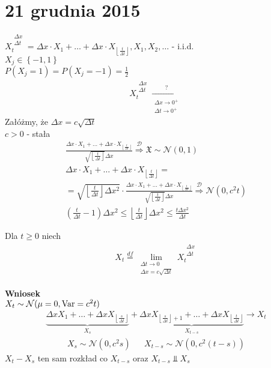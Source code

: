 \chapter{21 grudnia 2015}
$ X_t^{\substack{\Delta x\\\Delta t}} =\Delta x\cdot X_1+\dots +\Delta x\cdot X_{\left \lfloor\frac{t}{\Delta t}\right \rfloor}, X_1,X_2,\dots$ - i.i.d.\\
$ X_j\in\left\{-1,1\right\} $\\
$P\left(X_j=1\right)=P\left(X_j=-1\right)=\frac{1}{2}$
\begin{gather*}
X_t^{\substack{\Delta x\\\Delta t}}\xrightarrow[\substack{\Delta x\to 0^+\\\Delta t\to 0^+}]{?}
\end{gather*}
Załóżmy, że $ \Delta x=c\sqrt{\Delta t} $\\
$ c>0 $ - stała
\begin{gather*}
\frac{\Delta x\cdot X_1+\dots +\Delta x\cdot X_{\left \lfloor\frac{t}{\Delta t}\right \rfloor}}{\sqrt{\left \lfloor\frac{t}{\Delta t}\right \rfloor}\Delta x} \stackrel{\mathcal D}{\Longrightarrow}\mathfrak X\sim \mathcal N(0,1)\\
\Delta x\cdot X_1+\dots +\Delta x\cdot X_{\left \lfloor\frac{t}{\Delta t}\right \rfloor}
=\\=
\sqrt{\left \lfloor\frac{t}{\Delta t}\right \rfloor\Delta x^2}\cdot
\frac{\Delta x\cdot X_1+\dots +\Delta x\cdot X_{\left \lfloor\frac{t}{\Delta t}\right \rfloor}}{\sqrt{\left \lfloor\frac{t}{\Delta t}\right \rfloor}\Delta x}\stackrel{\mathcal D}{\Longrightarrow}\mathcal N(0,c^2t)\\
\left(\frac{t}{\Delta t}-1\right)\Delta x^2\le \left \lfloor\frac{t}{\Delta t}\right \rfloor\Delta x^2\le \frac{t \Delta x^2}{\Delta t}
\end{gather*}
\begin{defi}
Dla $ t\ge 0 $ niech
\begin{gather*}
X_t\stackrel{df}{=}\lim\limits_{\substack{\Delta t\to 0\\\Delta x=c\sqrt{\Delta t}}} X_t^{\substack{\Delta x\\\Delta t}}
\end{gather*}
\end{defi}

\textbf{Wniosek}\\
$ X_t\sim\mathcal N(\mu=0,\text{Var}=c^2t) $
\begin{gather*}
\underbrace{\Delta xX_1+\dots+\Delta xX_{\left \lfloor\frac{s}{\Delta t}\right \rfloor}}_{X_s}+
\underbrace{\Delta xX_{\left \lfloor\frac{s}{\Delta t}\right \rfloor+1}+\dots+\Delta xX_{\left \lfloor\frac{t}{\Delta t}\right \rfloor}}_{X_{t-s}}\to X_t
\end{gather*}
\begin{align*}
X_s\sim \mathcal N(0,c^2s)&&
X_{t-s}\sim \mathcal N(0,c^2(t-s))
\end{align*}
$ X_t-X_s $ ten sam rozkład co $ X_{t-s} $ oraz $ X_{t-s}\Perp X_s $

